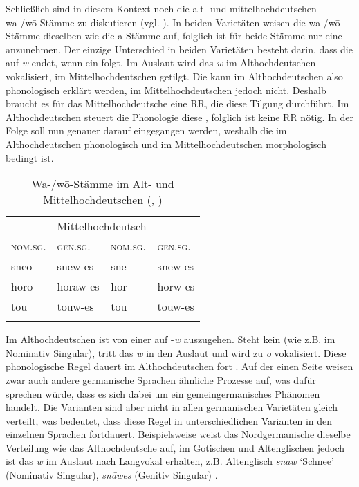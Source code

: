 Schließlich sind in diesem Kontext noch die alt- und mittelhochdeutschen wa-/w\=o-Stäm\-me zu diskutieren (vgl. ). In beiden Varietäten weisen die wa-/w\=o-Stäm\-me dieselben  wie die a-Stäm\-me auf, folglich ist für beide Stämme nur eine  anzunehmen. Der einzige Unterschied in beiden Varietäten besteht darin, dass die  auf \textit{w} endet, wenn ein  folgt. Im Auslaut wird das \textit{w} im Althochdeutschen vokalisiert, im Mittelhochdeutschen getilgt. Die  kann im Althochdeutschen also phonologisch erklärt werden, im Mittelhochdeutschen jedoch nicht. Deshalb braucht es für das Mittelhochdeutsche eine RR, die diese Tilgung durchführt. Im Althochdeutschen steuert die Phonologie diese , folglich ist keine RR nötig. In der Folge soll nun genauer darauf eingegangen werden, weshalb die  im Althochdeutschen phonologisch und im Mittelhochdeutschen morphologisch bedingt ist.


\begin{table}
\caption{Wa-/w\=o-Stämme im Alt- und Mittelhochdeutschen (\citealt[193]{Braune2004}, \citealt[143, 189]{Paul2007})}\label{table5.2}
\begin{tabular}{llll}
\lsptoprule
\multicolumn{2}{c}{{Althochdeutsch}} & \multicolumn{2}{c}{{Mittelhochdeutsch}}\\\cmidrule(lr){1-2}\cmidrule(lr){3-4}
{\textsc{nom}.\textsc{sg}.} & {\textsc{gen.sg.}} & \textsc{nom.sg.} & \textsc{gen.sg.}\\
\midrule
sn\=eo & sn\=ew-es & sn\=e & sn\=ew-es\\
horo & horaw-es & hor & horw-es\\
tou & touw-es & tou & touw-es\\
\lspbottomrule
\end{tabular}
\end{table}

Im Althochdeutschen ist von einer  auf -\textit{w} auszugehen. Steht kein  (wie z.B. im Nominativ Singular), tritt das \textit{w} in den Auslaut und wird zu \textit{o} vokalisiert. Diese phonologische Regel dauert im Althochdeutschen fort \citep[68]{VoylesBarrack2014}. Auf der einen Seite weisen zwar auch andere germanische Sprachen ähnliche Prozesse auf, was dafür sprechen würde, dass es sich dabei um ein gemeingermanisches Phänomen handelt. Die Varianten sind aber nicht in allen germanischen Varietäten gleich verteilt, was bedeutet, dass diese Regel in unterschiedlichen Varianten in den einzelnen Sprachen fortdauert. Beispielsweise weist das Nordgermanische dieselbe Verteilung wie das Althochdeutsche auf, im Gotischen und Altenglischen jedoch ist das \textit{w} im Auslaut nach Langvokal erhalten, z.B. Altenglisch \textit{sn\=aw} ‘Schnee’ (Nominativ Singular), \textit{sn\=awes} (Genitiv Singular) \citep[18--19]{KraheMeid1967}.

